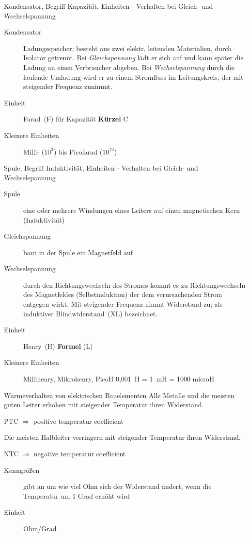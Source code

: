 \documentclass[avery5371,grid,frame,a4paper]{flashcards}
\newcommand{\card}[3]{
  \begin{flashcard}[{\chap} -- #1]{#2}#3\end{flashcard}
}
\begin{document}
\card{03}{Kondensator, Begriff Kapazität, Einheiten - Verhalten bei Gleich- und Wechselspannung}{
  \small
  \begin{description}
    \item[Kondensator]
      Ladungsspeicher; besteht aus zwei elektr. leitenden Materialien, durch Isolator getrennt.
      Bei \emph{Gleichspannung} lädt er sich auf und kann später die Ladung an einen Verbraucher abgeben.
      Bei \emph{Wechselspannung} durch die laufende Umladung wird er zu einem Stromfluss im Leitungskreis,
      der mit steigender Frequenz zunimmt.
    \item[Einheit] Farad~(F) für Kapazität  \hspace{20pt} \textbf{Kürzel} C
    \item[Kleinere Einheiten] Milli- ($10^3$) bis Picofarad ($10^{12}$)
  \end{description}
}

\card{04}{Spule, Begriff Induktivität, Einheiten - Verhalten bei Gleich- und Wechselspannung}{
  \footnotesize
  \begin{description}
    \item[Spule] eine oder mehrere Windungen eines Leiters auf einen magnetischen Kern (Induktivität)
    \item[Gleichspannung] baut in der Spule ein Magnetfeld auf
    \item[Wechselspannung] durch den Richtungswechseln des Stromes kommt es zu Richtungswechseln des Magnetfeldes (Selbstinduktion) der dem verursachenden Strom entgegen wirkt.
    Mit steigender Frequenz nimmt Widerstand zu; als induktiver Blindwiderstand~(XL) bezeichnet.
    \item[Einheit] Henry~(H)   \hspace{50pt} \textbf{Formel} (L)
    \item[Kleinere Einheiten] Millihenry, Mikrohenry, PicoH 0,001~H = 1~mH = 1000 microH
  \end{description}
}

\card{05}{Wärmeverhalten von elektrischen Bauelementen}{
  Alle Metalle und die meisten guten Leiter erhöhen mit steigender Temperatur ihren Widerstand.
  \centerline{PTC $\Rightarrow$ positive temperatur coefficient}
  Die meisten Halbleiter verringern mit steigender Temperatur ihren Widerstand.
  \centerline{NTC $\Rightarrow$ negative temperatur coefficient}
  \small
  \begin{description}
    \item[Kenngrößen] gibt an um wie viel Ohm sich der Widerstand ändert, wenn die Temperatur um 1 Grad erhöht wird
    \item[Einheit] Ohm/Grad
  \end{description}
}
\end{document}
